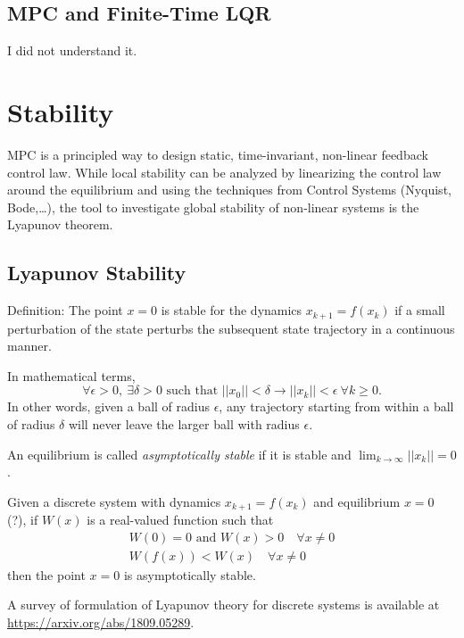 \subsection{MPC and Finite-Time LQR}
\label{sec:MPC-finite-time-LQR}

I did not understand it.


\section{Stability}
\label{sec:mpc-stability}

MPC is a principled way to design static, time-invariant, non-linear feedback control law. While local stability can be analyzed by linearizing the control law around the equilibrium and using the techniques from Control Systems (Nyquist, Bode,\ldots), the tool to investigate global stability of non-linear systems is the Lyapunov theorem.

\subsection{Lyapunov Stability}
\label{sec:lyapunov-stability}

Definition: The point $x=0$ is stable for the dynamics $x_{k+1} = f(x_k)$ if a small perturbation of the state perturbs the subsequent state trajectory in a continuous manner.

In mathematical terms,
\begin{equation}
  \label{eq:lyapunov-stability-stable-equilibrium}
  \forall \epsilon > 0,\ \exists \delta > 0 \text{ such that } ||x_0|| < \delta \rightarrow ||x_k|| < \epsilon\ \forall k \ge 0.
\end{equation}
In other words, given a ball of radius $\epsilon$, any trajectory starting from within a ball of radius $\delta$ will never leave the larger ball with radius $\epsilon$.

An equilibrium is called \emph{asymptotically stable} if it is stable and $\lim_{k\rightarrow \infty} ||x_k||=0$.

\begin{theorem}
  \label{th:lyapunov}
  Given a discrete system with dynamics $x_{k+1} = f(x_k)$ and equilibrium $x=0$ (?), if $W(x)$ is a real-valued function such that
  \begin{equation*}
    \begin{aligned}
      W(0)=0 \textrm{ and } W(x)>0\quad \forall x\neq 0 \\
      W(f(x)) < W(x)\quad \forall x\neq 0
    \end{aligned}
  \end{equation*}
  then the point $x=0$ is asymptotically stable.
\end{theorem}
A survey of formulation of Lyapunov theory for discrete systems is available at \url{https://arxiv.org/abs/1809.05289}.

